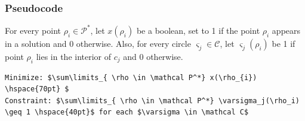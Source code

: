 \documentclass[a4paper,12pt]{article}
\begin{document}
\subsubsection{Pseudocode }
For every point $\rho_i \in \mathcal P^*$, let $x(\rho_i)$ be a boolean, set to 1 if the point $\rho_i$ appears in a solution and 0 otherwise. Also, for every circle $\varsigma_j \in \mathcal C$, let $\varsigma_j (\rho_i)$ be 1 if point $\rho_i$ lies in the interior of $c_j$ and 0 otherwise.



\begin{lstlisting}[mathescape]
Minimize: $\sum\limits_{ \rho \in \mathcal P^*} x(\rho_{i}) \hspace{70pt} $
Constraint: $\sum\limits_{ \rho \in \mathcal P^*} \varsigma_j(\rho_i) \geq 1 \hspace{40pt}$ for each $\varsigma \in \mathcal C$
\end{lstlisting}
\end{document}
